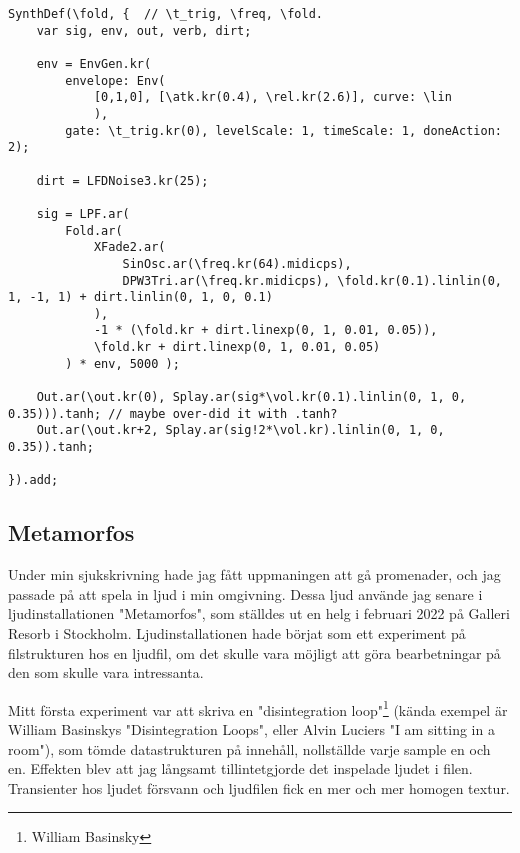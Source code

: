 \documentclass{article}
\begin{document}
\begin{lstlisting}[style=SuperCollider-IDE, caption=Fold-synt]
SynthDef(\fold, {  // \t_trig, \freq, \fold.
	var sig, env, out, verb, dirt;

	env = EnvGen.kr(
		envelope: Env(
			[0,1,0], [\atk.kr(0.4), \rel.kr(2.6)], curve: \lin
			), 
		gate: \t_trig.kr(0), levelScale: 1, timeScale: 1, doneAction: 2);

	dirt = LFDNoise3.kr(25);

	sig = LPF.ar( 
		Fold.ar(
			XFade2.ar(
				SinOsc.ar(\freq.kr(64).midicps), 
				DPW3Tri.ar(\freq.kr.midicps), \fold.kr(0.1).linlin(0, 1, -1, 1) + dirt.linlin(0, 1, 0, 0.1)
			),
			-1 * (\fold.kr + dirt.linexp(0, 1, 0.01, 0.05)),
			\fold.kr + dirt.linexp(0, 1, 0.01, 0.05)
		) * env, 5000 );

	Out.ar(\out.kr(0), Splay.ar(sig*\vol.kr(0.1).linlin(0, 1, 0, 0.35))).tanh; // maybe over-did it with .tanh?
	Out.ar(\out.kr+2, Splay.ar(sig!2*\vol.kr).linlin(0, 1, 0, 0.35)).tanh;

}).add;
\end{lstlisting}

  \subsection{Metamorfos}
  Under min sjukskrivning hade jag fått uppmaningen att gå promenader, och jag passade på att spela in ljud i
  min omgivning. Dessa ljud använde jag senare i ljudinstallationen "Metamorfos", som ställdes ut en helg i
  februari 2022 på Galleri Resorb i Stockholm. Ljudinstallationen hade börjat som ett experiment på
  filstrukturen hos en ljudfil, om det skulle vara möjligt att göra bearbetningar på den som skulle vara
  intressanta. 

  Mitt första experiment var att skriva en "disintegration loop"\footnote{William Basinsky} (kända
  exempel är William Basinskys "Disintegration Loops", eller Alvin Luciers "I am sitting in a room"), som
  tömde datastrukturen på innehåll, nollställde varje sample en och en. Effekten blev att jag långsamt
  tillintetgjorde det inspelade ljudet i filen. Transienter hos ljudet försvann och ljudfilen fick en mer och
  mer homogen textur.
\end{document}
